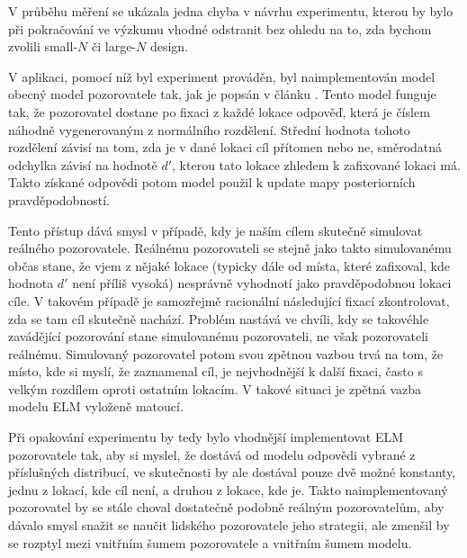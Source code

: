 V průběhu měření se ukázala jedna chyba v návrhu experimentu, kterou by
bylo při pokračování ve výzkumu vhodné odstranit bez ohledu na to, zda bychom
zvolili small-$N$ či large-$N$ design. 

V aplikaci, pomocí níž byl experiment prováděn, byl naimplementován model obecný
model pozorovatele tak, jak je popsán v článku \citep{Najemnik05}. Tento model
funguje tak, že pozorovatel dostane po fixaci z každé lokace odpověď, která je
číslem náhodně vygenerovaným z normálního rozdělení. Střední hodnota tohoto
rozdělení závisí na tom, zda je v dané lokaci cíl přítomen nebo ne, směrodatná
odchylka závisí na hodnotě $d'$, kterou tato lokace zhledem k zafixované lokaci
má. Takto získané odpovědi potom model použil k update mapy posteriorních
pravděpodobností.

Tento přístup dává smysl v případě, kdy je naším cílem skutečně simulovat
reálného pozorovatele. Reálnému pozorovateli se stejně jako takto simulovanému
občas stane, že vjem z nějaké lokace (typicky dále od místa, které zafixoval,
kde hodnota $d'$ není příliš vysoká) nesprávně vyhodnotí jako pravděpodobnou lokaci
cíle. V takovém případě je samozřejmě racionální následující fixací
zkontrolovat, zda se tam cíl skutečně nachází. Problém nastává ve chvíli, kdy
se takovéhle zavádějící pozorování stane simulovanému pozorovateli, ne však
pozorovateli reálnému. Simulovaný pozorovatel potom svou zpětnou vazbou trvá na
tom, že místo, kde si myslí, že zaznamenal cíl, je nejvhodnější k další fixaci,
často s velkým rozdílem oproti ostatním lokacím. V takové situaci je zpětná
vazba modelu ELM vyloženě matoucí. 

Při opakování experimentu by tedy bylo vhodnější implementovat ELM pozorovatele
tak, aby si myslel, že dostává od modelu odpovědi vybrané z příslušných
distribucí, ve skutečnosti by ale dostával pouze dvě možné konstanty, jednu z
lokací, kde cíl není, a druhou z lokace, kde je. Takto naimplementovaný
pozorovatel by se stále choval dostatečně podobně reálným pozorovatelům, aby
dávalo smysl snažit se naučit lidského pozorovatele jeho strategii, ale zmenšil
by se rozptyl mezi vnitřním šumem pozorovatele a vnitřním šumem modelu.

